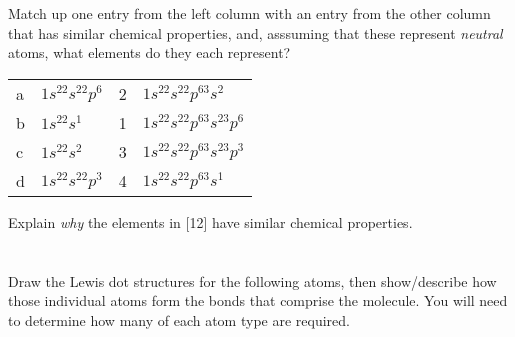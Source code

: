 \documentclass[addpoints, 12pt]{exam}
\begin{document}
\begin{questions}

\question[5] Match up one entry from the left column with an entry from the other
  column that has similar chemical properties, and, asssuming that
  these represent \emph{neutral} atoms, what elements do they each represent?

\begin{tabular}{|l|l|l|l|}
a& $1s^22s^22p^6$ & 2& $1s^22s^22p^63s^2$ \\
b& $1s^22s^1$ & 1& $1s^22s^22p^63s^23p^6$ \\
c& $1s^22s^2$ & 3& $1s^22s^22p^63s^23p^3$ \\
d& $1s^22s^22p^3$ & 4&$1s^22s^22p^63s^1$  
\end{tabular}

\question[5]  Explain \emph{why} the elements in [12] have similar
chemical properties.

\section{}

\question[10] Draw the Lewis dot structures for the following atoms, then
show/describe how those individual atoms form the bonds that comprise
the molecule.  You will need to determine how many of each atom type
are required.


\end{questions}
\end{document}
